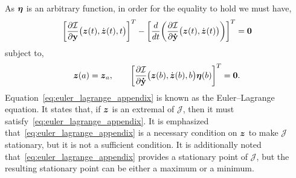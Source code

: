 \documentclass[3p,computermodern,10pt]{elsarticle}
\begin{document}
\begin{appendices}
$$$$
As $\boldsymbol \eta$ is an arbitrary function, in order for the equality to hold we must have,
\begin{equation}\label{eq:euler_lagrange_appendix}
\bigg[ \frac{\partial \mathcal{I}  }{\partial \mathbf{y} } \big(\boldsymbol z(t),\dot{\boldsymbol z}(t) ,t\big) \bigg]^T - \bigg[ \frac{d}{dt}\bigg( \frac{\partial \mathcal{I}}{\partial \mathbf{\dot{y}} }  \big(\boldsymbol z(t),\dot{\boldsymbol z}(t) \big) \bigg) \bigg]^T = \boldsymbol 0  
\end{equation}
subject to,
$$
\boldsymbol z(a) = \boldsymbol z_a, \qquad \bigg[ \frac{\partial \mathcal{I}}{\partial \mathbf{\dot{y}}} \big(\boldsymbol z(b),\dot{\boldsymbol z}(b),b \big) \boldsymbol \eta(b) \bigg]^T = \boldsymbol 0.
$$
Equation~\eqref{eq:euler_lagrange_appendix} is known as the Euler--Lagrange equation. It states that, if $\boldsymbol z$ is an extremal of $\mathcal{J}$, then it must satisfy~\eqref{eq:euler_lagrange_appendix}. It is emphasized that~\eqref{eq:euler_lagrange_appendix} is a necessary condition on $\boldsymbol z$ to make $\mathcal{J}$ stationary, but it is not a sufficient condition. It is additionally noted that~\eqref{eq:euler_lagrange_appendix} provides a stationary point of $\mathcal{J}$, but the resulting stationary point can be either a maximum or a minimum.


\end{appendices}
\end{document}

